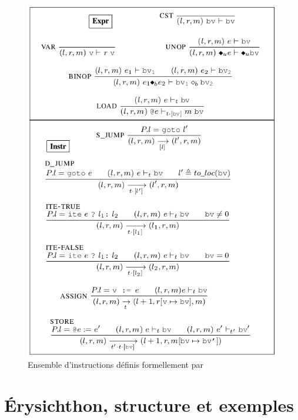 \begin{figure}
  \centering
  \includegraphics[scale = 0.5]{pictures/instructions_formelles.png}
  \caption{Ensemble d'instructions définis formellement par \cite{binsecRel2019}}
  \label{fig:ensemble_instr_formelles}
\end{figure}


\chapter{Érysichthon, structure et exemples}

